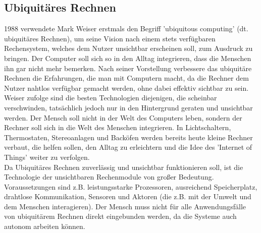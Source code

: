 \subsection{Ubiquit\"ares Rechnen}\label{ss:UbiquitaeresRechnen}

1988 verwendete Mark Weiser erstmals den Begriff 'ubiquitous computing' (dt. ubiquitäres Rechnen), um seine Vision nach einem stets verfügbaren Rechensystem, welches dem Nutzer unsichtbar erscheinen soll, zum Ausdruck zu bringen. Der Computer soll sich so in den Alltag integrieren, dass die Menschen ihn gar nicht mehr bemerken. Nach seiner Vorstellung verbessere das ubiquitäre Rechnen die Erfahrungen, die man mit Computern macht, da die Rechner dem Nutzer nahtlos verfügbar gemacht werden, ohne dabei effektiv sichtbar zu sein.\\

Weiser zufolge sind die besten Technologien diejenigen, die scheinbar verschwinden, tatsächlich jedoch nur in den Hintergrund geraten und unsichtbar werden. Der Mensch soll nicht in der Welt des Computers leben, sondern der Rechner soll sich in die Welt des Menschen integrieren. In Lichtschaltern, Thermostaten, Stereoanlagen und Backöfen werden bereits heute kleine Rechner verbaut, die helfen sollen, den Alltag zu erleichtern und die Idee des 'Internet of Things' weiter zu verfolgen.\\

Da Ubiquitäres Rechnen zuverlässig und unsichtbar funktionieren soll, ist die Technologie der unsichtbaren Rechenmodule von großer Bedeutung. Voraussetzungen sind z.B. leistungsstarke Prozessoren, ausreichend Speicherplatz, drahtlose Kommunikation, Sensoren und Aktoren (die z.B. mit der Umwelt und dem Menschen interagieren). Der Mensch muss nicht für alle Anwendungsfälle von ubiquitärem Rechnen direkt eingebunden werden, da die Systeme auch autonom arbeiten können\cite{d:wolf}.\\